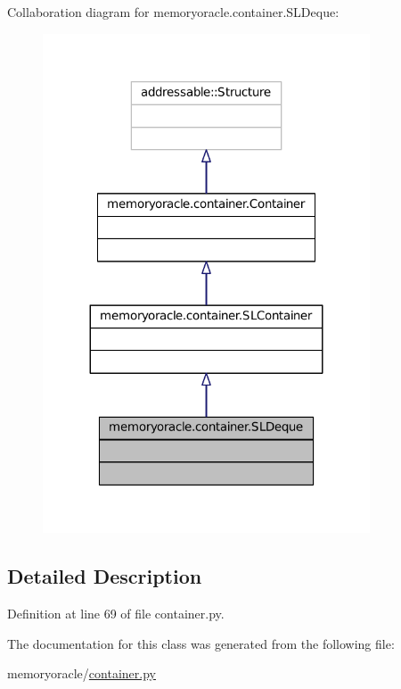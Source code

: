 Collaboration diagram for memoryoracle.\+container.\+S\+L\+Deque\+:\nopagebreak
\begin{figure}[H]
\begin{center}
\leavevmode
\includegraphics[width=275pt]{classmemoryoracle_1_1container_1_1SLDeque__coll__graph}
\end{center}
\end{figure}


\subsection{Detailed Description}


Definition at line 69 of file container.\+py.



The documentation for this class was generated from the following file\+:\begin{DoxyCompactItemize}
\item 
memoryoracle/\hyperlink{container_8py}{container.\+py}\end{DoxyCompactItemize}
